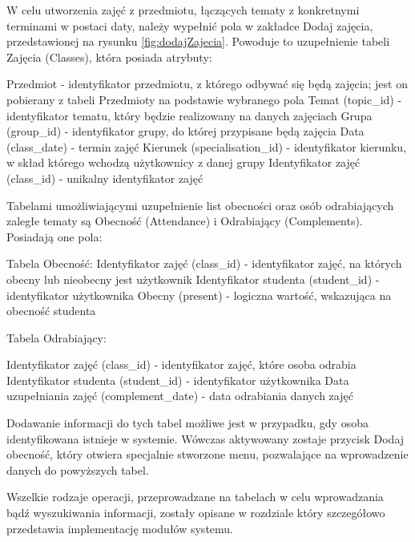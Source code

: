 W celu utworzenia zajęć z przedmiotu, łączących tematy z konkretnymi terminami w postaci daty, należy wypełnić pola w zakładce Dodaj zajęcia, przedstawionej na rysunku \ref{fig:dodajZajecia}. Powoduje to uzupełnienie tabeli Zajęcia (Classes), która posiada atrybuty:

Przedmiot - identyfikator przedmiotu, z którego odbywać się będą zajęcia; jest on pobierany z tabeli Przedmioty na podstawie wybranego pola
Temat (topic\_id) - identyfikator tematu, który będzie realizowany na danych zajęciach
Grupa (group\_id) - identyfikator grupy, do której przypisane będą zajęcia
Data (class\_date) - termin zajęć
Kierunek (specialisation\_id) - identyfikator kierunku, w skład którego wchodzą użytkownicy z danej grupy
Identyfikator zajęć (class\_id) - unikalny identyfikator zajęć

Tabelami umożliwiającymi uzupełnienie list obecności oraz osób odrabiających zaległe tematy są Obecność (Attendance) i Odrabiający (Complements). Posiadają one pola:

Tabela Obecność:
Identyfikator zajęć (class\_id) - identyfikator zajęć, na których obecny lub nieobecny jest użytkownik
Identyfikator studenta (student\_id) - identyfikator użytkownika
Obecny (present) - logiczna wartość, wskazująca na obecność studenta

Tabela Odrabiający:

Identyfikator zajęć (class\_id) - identyfikator zajęć, które osoba odrabia
Identyfikator studenta (student\_id) - identyfikator użytkownika
Data uzupełniania zajęć (complement\_date) - data odrabiania danych zajęć

Dodawanie informacji do tych tabel możliwe jest w przypadku, gdy osoba identyfikowana istnieje w systemie. Wówczas aktywowany zostaje przycisk Dodaj obecność, który otwiera specjalnie stworzone menu, pozwalające na wprowadzenie danych do powyższych tabel.

Wszelkie rodzaje operacji, przeprowadzane na tabelach w celu wprowadzania bądź wyszukiwania informacji, zostały opisane w rozdziale który szczegółowo przedstawia implementację modułów systemu.
